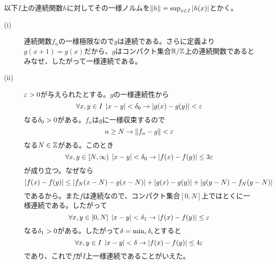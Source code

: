 \subsubsection{} %
\begin{sol} 以下$I$上の連続関数$h$に対してその一様ノルムを$\left \lVert h \right \rVert = \sup_{x \in I} \left \lvert h(x) \right \rvert$とかく。
  \begin{description}
    \item[(i)] 連続関数$f_n$の一様極限なので$g$は連続である。さらに定義より$g(x+1)=g(x)$だから、$g$はコンパクト集合${\mathbb R} / {\mathbb Z}$上の連続関数であるとみなせ、したがって一様連続である。
    \item[(ii)] ${\varepsilon} > 0$が与えられたとする。$g$の一様連続性から
    \[
    \forall x,y \in I \; \left \lvert x-y \right \rvert< {\delta}_0 \to \left \lvert g(x) - g(y)  \right \rvert < {\varepsilon}
    \]
    なる${\delta}_0 > 0$がある。$f_n$は$g$に一様収束するので
    \[
    n \geq N \to \left \lVert f_n - g \right \rVert < {\varepsilon}
    \]
    なる$N \in {\mathbb Z}$がある。このとき
    \[
    \forall x,y \in [N,\infty) \; \left \lvert x - y  \right \rvert < {\delta}_0 \to \left \lvert f(x) - f(y) \right \rvert \leq 3{\varepsilon}
    \]
    が成り立つ。なぜなら
    \[
    \left \lvert f(x) - f(y) \right \rvert  \leq \left \lvert f_N(x-N) - g(x-N) \right \rvert + \left \lvert g(x)-g(y) \right \rvert + \left \lvert g(y-N)-f_N(y-N) \right \rvert
    \]
    であるから。また$f$は連続なので、コンパクト集合$[0,N]$上ではとくに一様連続である。したがって
    \[
    \forall x,y \in [0,N] \; \left \lvert x - y  \right \rvert < {\delta}_1 \to \left \lvert f(x) - f(y) \right \rvert \leq {\varepsilon}
    \]
    なる${\delta}_1 > 0$がある。したがって${\delta}= \min_i{{\delta}_i}$とすると
    \[
    \forall x,y \in I \; \left \lvert x - y  \right \rvert < {\delta} \to \left \lvert f(x) - f(y) \right \rvert \leq 4{\varepsilon}
    \]
    であり、これで$f$が$I$上一様連続であることがいえた。
  \end{description}
\end{sol}






\newpage



